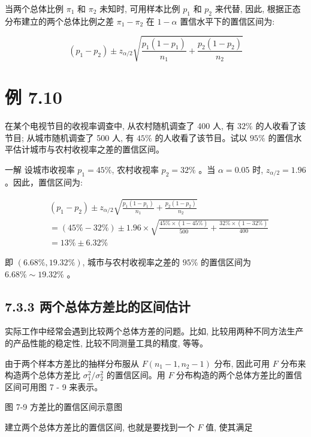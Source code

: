 \documentclass[10pt]{article}
\begin{document}
\begin{CJK*}{UTF8}{bsmi}
当两个总体比例 $\pi_{1}$ 和 $\pi_{2}$ 未知时, 可用样本比例 $p_{1}$ 和 $p_{2}$ 来代替, 因此, 根据正态分布建立的两个总体比例之差 $\pi_{1}-\pi_{2}$ 在 $1-\alpha$ 置信水平下的置信区间为:


\begin{equation*}
\left(p_{1}-p_{2}\right) \pm z_{\alpha / 2} \sqrt{\frac{p_{1}\left(1-p_{1}\right)}{n_{1}}+\frac{p_{2}\left(1-p_{2}\right)}{n_{2}}} \tag{7.23}
\end{equation*}


\section*{例 7.10}
在某个电视节目的收视率调查中, 从农村随机调查了 400 人, 有 $32 \%$ 的人收看了该节目; 从城市随机调查了 500 人, 有 $45 \%$ 的人收看了该节目。试以 $95 \%$ 的置信水平估计城市与农村收视率之差的置信区间。

一解 设城市收视率 $p_{1}=45 \%$, 农村收视率 $p_{2}=32 \%$ 。当 $\alpha=0.05$ 时, $z_{\alpha / 2}=1.96$ 。因此，置信区间为:

$$
\begin{aligned}
& \left(p_{1}-p_{2}\right) \pm z_{\alpha / 2} \sqrt{\frac{p_{1}\left(1-p_{1}\right)}{n_{1}}+\frac{p_{2}\left(1-p_{2}\right)}{n_{2}}} \\
& =(45 \%-32 \%) \pm 1.96 \times \sqrt{\frac{45 \% \times(1-45 \%)}{500}+\frac{32 \% \times(1-32 \%)}{400}} \\
& =13 \% \pm 6.32 \%
\end{aligned}
$$

即 $(6.68 \%, 19.32 \%)$, 城市与农村收视率之差的 $95 \%$ 的置信区间为 $6.68 \% \sim 19.32 \%$ 。

\subsection*{7.3.3 两个总体方差比的区间估计}
实际工作中经常会遇到比较两个总体方差的问题。比如, 比较用两种不同方法生产的产品性能的稳定性, 比较不同测量工具的精度, 等等。

由于两个样本方差比的抽样分布服从 $F\left(n_{1}-1, n_{2}-1\right)$ 分布, 因此可用 $F$ 分布来构造两个总体方差比 $\sigma_{1}^{2} / \sigma_{2}^{2}$ 的置信区间。用 $F$ 分布构造的两个总体方差比的置信区间可用图 7 - 9 来表示。

\begin{center}
\end{center}

图 7-9 方差比的置信区间示意图

建立两个总体方差比的置信区间, 也就是要找到一个 $F$ 值, 使其满足



\end{CJK*}
\end{document}
